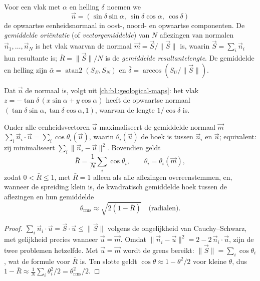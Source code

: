 \begin{definition}\label{def:b1:field-lab-methods-1:mean-orientation}
Voor een vlak met  $\alpha$ en helling $\delta$ noemen we
\[
  \vec n = (\sin\delta\sin\alpha,\ \sin\delta\cos\alpha,\ \cos\delta)
\]
de opwaartse eenheidsnormaal in oost-, noord- en opwaartse componenten. De \emph{gemiddelde
oriëntatie} (of \emph{vectorgemiddelde}) van $N$ aflezingen van normalen
$\vec n_1, \dots, \vec n_N$ is het vlak waarvan de normaal
$\vec m = \vec S/\|\vec S\|$ is, waarin $\vec S = \sum_i \vec n_i$ hun resultante is; $\bar R = \|\vec S\|/N$ is de
\emph{gemiddelde resultantelengte}. De gemiddelde  en helling zijn
$\bar\alpha = \operatorname{atan2}(S_E, S_N)$ en $\bar\delta = \arccos(S_U/\|\vec S\|)$.
\end{definition}

Dat $\vec n$ de normaal is, volgt uit \cref{ch:b1:geological-maps}: het vlak $z = -\tan\delta\,(x\sin\alpha + y\cos\alpha)$
heeft de opwaartse normaal $(\tan\delta\sin\alpha, \tan\delta\cos\alpha, 1)$, waarvan de lengte
$1/\cos\delta$ is.

\begin{proposition}\label{prop:b1:field-lab-methods-1:vector-mean}
Onder alle eenheidsvectoren $\vec u$ maximaliseert de gemiddelde normaal $\vec m$
$\sum_i \vec n_i\cdot\vec u = \sum_i \cos\theta_i(\vec u)$, waarin
$\theta_i(\vec u)$ de hoek is tussen $\vec n_i$ en $\vec u$; equivalent: zij minimaliseert $\sum_i \|\vec n_i - \vec u\|^2$.
Bovendien geldt
\[
  \bar R = \frac1N\sum_i \cos\theta_i, \qquad \theta_i = \theta_i(\vec m),
\]
zodat $0 < \bar R \le 1$, met $\bar R = 1$ alleen als alle aflezingen overeenstemmen, en, wanneer de spreiding klein
is, de kwadratisch gemiddelde hoek tussen de aflezingen en hun gemiddelde
\[
  \theta_{\text{rms}} \approx \sqrt{2(1 - \bar R)} \quad\text{(radialen)}.
\]
\end{proposition}

\begin{proof}
$\sum_i \vec n_i\cdot\vec u = \vec S\cdot\vec u \le \|\vec S\|$ volgens de ongelijkheid van Cauchy--Schwarz, met gelijkheid
precies wanneer $\vec u = \vec m$. Omdat $\|\vec n_i - \vec u\|^2 = 2 - 2\,\vec n_i\cdot\vec u$, zijn de twee problemen
hetzelfde. Met $\vec u = \vec m$ wordt de grens bereikt: $\|\vec S\| = \sum_i\cos\theta_i$, wat de formule voor $\bar R$ is.
Ten slotte geldt $\cos\theta \approx 1 - \theta^2/2$ voor kleine $\theta$, dus $1 - \bar R \approx
\frac1N\sum_i\theta_i^2/2 = \theta_{\text{rms}}^2/2$.
\end{proof}

